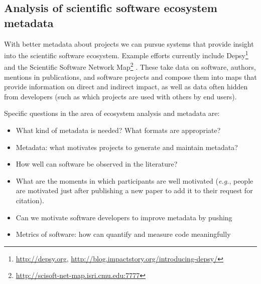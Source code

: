 \documentclass[a4paper,UKenglish]{dagman}
\newcommand{\eg}{\emph{e.g.},\xspace}
\begin{document}
\subsection{Analysis of scientific software ecosystem metadata}

With better metadata about projects we can pursue systems that provide insight into the scientific software ecosystem.
Example efforts currently include Depsy\footnote{\url{http://depsy.org}, \url{http://blog.impactstory.org/introducing-depsy/}}
and the Scientific Software Network Map\footnote{%
\url{http://scisoft-net-map.isri.cmu.edu:7777}}
\cite{mcconahy2012techniques,howison2015understanding}.
These take data on software, authors, mentions in publications, and software projects and compose them into maps that provide information on direct and indirect impact, as well as data often hidden from developers (such as which projects are used with others by end users).

Specific questions in the area of ecosystem analysis and metadata are:

\begin{itemize}
\item What kind of metadata is needed? What formats are appropriate?
\item Metadata: what motivates projects to generate and maintain metadata?
\item How well can software be observed in the literature?
\item What are the moments in which participants are well motivated (\eg people are motivated just after publishing a new paper to add it to their request for citation).
\item Can we motivate software developers to improve metadata by pushing 
\item Metrics of software: how can quantify and measure code meaningfully
\end{itemize}
\end{document}
